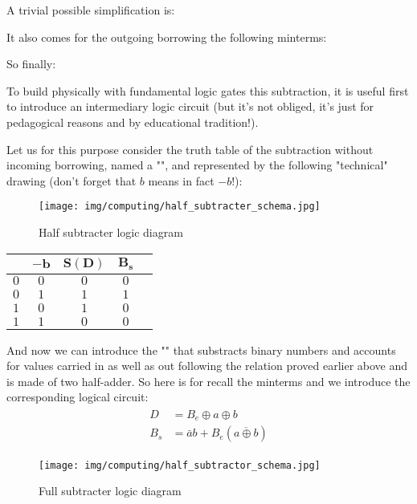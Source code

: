 	A trivial possible simplification is:
	
	It also comes for the outgoing borrowing the following minterms:
	
	So finally:
	
	To build physically with fundamental logic gates this subtraction, it is useful first to introduce an intermediary logic circuit (but it's not obliged, it's just for pedagogical reasons and by educational tradition!). 
	
	Let us for this purpose consider the truth table of the subtraction without incoming borrowing, named a "", and represented by the following "technical" drawing (don't forget that $b$ means in fact $-b$!):
	\begin{figure}[H]
		\centering
		\texttt{[image: img/computing/half\_subtracter\_schema.jpg]}
		\caption{Half subtracter logic diagram}
	\end{figure}
	\begin{table}[H]
		\centering
		\begin{tabular}{|c|c|c|c|c|}
		\hline
		\rowcolor[HTML]{9B9B9B} 
		\multicolumn{1}{l|}{\cellcolor[HTML]{9B9B9B}$\pmb{a}$} & \multicolumn{1}{l|}{\cellcolor[HTML]{9B9B9B}$\pmb{-b}$} & \multicolumn{1}{l|}{\cellcolor[HTML]{9B9B9B}$\pmb{S(D)}$} & \multicolumn{1}{l|}{\cellcolor[HTML]{9B9B9B}$\pmb{B_s}$} \\ \hline
		$0$ & $0$ & $0$ & $0$ \\ \hline
		$0$ & $1$ & $1$ & $1$ \\ \hline
		$1$ & $0$ & $1$ & $0$ \\ \hline
		$1$ & $1$ & $0$ & $0$ \\ \hline
		\end{tabular}
	\end{table}
	And now we can introduce the "" that substracts binary numbers and accounts for values carried in as well as out following the relation proved earlier above and is made of two half-adder. So here is for recall the minterms and we introduce the corresponding logical circuit:
	\begin{gather*}
		\begin{aligned}
		D&=B_e\oplus a\oplus b\\
		B_s&=\bar{a}b+B_e(\overline{a\oplus b})
		\end{aligned}
	\end{gather*}
	\begin{figure}[H]
		\centering
		\texttt{[image: img/computing/half\_subtractor\_schema.jpg]}
		\caption{Full subtracter logic diagram}
	\end{figure}
